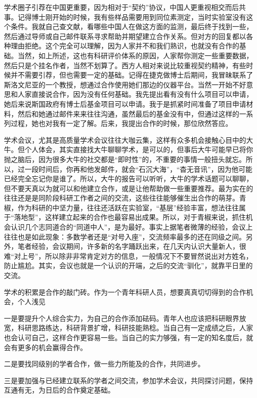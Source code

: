 \documentclass[]{book}
\begin{document}
学术圈子引荐在中国更重要，因为相对于``契约''协议，中国人更重视相交而后共事。记得博士刚开始的时候，我有些样品需要用到同位素测定，当时实验室没有这个条件。我就自己查文献，看哪些中国人在做这方面的监测，最后终于找到一些，然后通过导师或自己邮件联系寻求帮助并期望建立合作关系。但对方的回复都以各种理由拒绝。这个完全可以理解，因为人家并不和我们熟识，也就没有合作的基础。当然，如上所述，这也有科研评价体系的原因，人家帮你测定一些重要数据，然后只是个挂名作者，当然不划算了。西方人相对来说比较重视契约精神，有些时候并不需要引荐，但也需要一定的基础。记得在捷克做博士后期间，我冒昧联系了斯洛文尼亚的一个教授，想通过合作使用她们那边的仪器平台。当然一开始不好意思和人家直接说合作，因为没有任何基础。我先提出看有没有什么项目可以申请，她后来说斯国政府有博士后基金项目可以申请。我于是抓紧时间准备了项目申请材料，然后和她通过邮件来来往往沟通，虽然最后的基金没有中，但通过这样的一系列过程，她也对我有一定了解。后来，我提出合作的时候，那位欣然答应。

学术会议，尤其是高质量学术会议往往大咖云集，这样有众多机会接触心目中的大牛。但个人体会，其实直接找大牛聊聊学术，是可以的，但事后大牛可能早已将你抛之脑后，因为很多大牛的社交都是``即时性''的，不重要的事情一般扭头就忘。所以，过一段时间后，你再和他发邮件，就会``石沉大海''，``杳无音讯''，因为他可能已经完全忘记你是谁了。所以，大牛的报告可以听听，大牛的学术话题可以聊聊，但不要天真以为就可以和他建立合作，或是让他帮助做一些重要推荐。最为实在的往往还是是同阶段科研工作者之间的交流，这些往往能够催生出合作的萌芽。青椒，作为科研的中坚力量，往往还活跃在实验室，``基层''经验丰富，想法往往属于``落地型''，这样建立起来的合作也最容易出成果。所以，对于青椒来说，抓住机会认识几个志同道合的``同道中人''，是为最好。事实上据笔者微薄的经验，会议上往往也是如此现象：多数学者还是``对号入座''，交流频率最多的还在同级之间。另外，笔者经验，会议期间，许多新的名字踊跃出来，在几天内认识大量新人，很难``对上号''，所以除非非常肯定对方的信息，一般情况下不要冒然说出对方姓名，防止尴尬。其实，会议也就是一个认识的开端，之后的交流``驯化''，就靠平日里的交流。

学术的积累是合作的敲门砖。作为一个青年科研人员，想要真真切切得到的合作机会，个人浅见

一是要提升个人综合实力，为自己的合作添加砝码。青年人也应该把科研眼界放宽，科研思路练达，科研背景扩增，科研技能熟稔。当自己有一定成绩之后，人家也会认可自己，这样合作更容易一些。当自己的实力够强，有一定的知名度后，就会有更多的机会赢得合作。

二是要找同级别的学者合作，做一些力所能及的合作，共同进步。

三是要加强与已经建立联系的学者之间交流，参加学术会议，共同探讨问题，保持互通有无，为日后的合作奠定基础。
\end{document}
